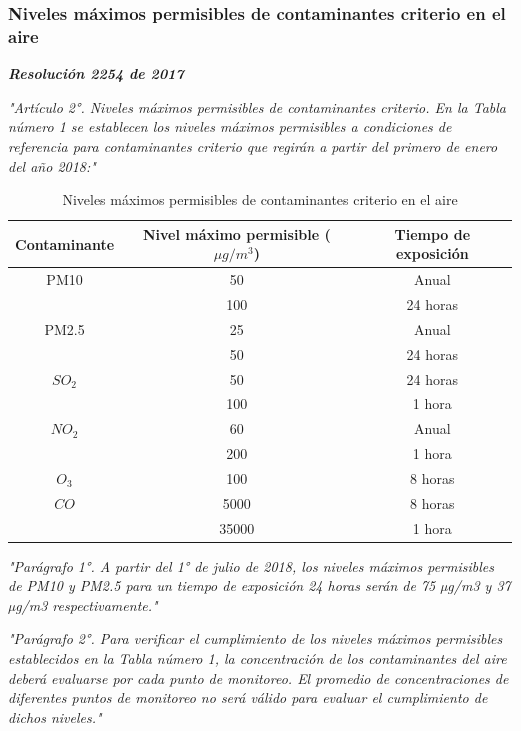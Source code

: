 \subsubsection{Niveles máximos permisibles de contaminantes criterio en el aire}

\textbf{\textit{Resolución 2254 de 2017}}

\textit{"Artículo 2°. Niveles máximos permisibles de contaminantes criterio. En la Tabla número 1 se establecen los niveles máximos permisibles a condiciones de referencia para contaminantes criterio que regirán a partir del primero de enero del año 2018:"}

\begin{table}[h!]
	\begin{center}
		\begin{tabular}{| c | c | c |}
			\hline
			\rowcolor{lightgray}Contaminante 	& Nivel máximo permisible ($ \mu g/m^3 $) 	& Tiempo de exposición	\\ \hline
			PM10			& 50 		& Anual		\\
			  				& 100 		& 24 horas	\\ \hline
			PM2.5 			& 25 		& Anual 	\\
				 			& 50 		& 24 horas	\\ \hline
 			$ SO_2 $		& 50 		& 24 horas 	\\
 							& 100 		& 1 hora	\\ \hline
 			$ NO_2 $		& 60 		& Anual 	\\
 							& 200 		& 1 hora	\\ \hline
 			$ O_3 $			& 100 		& 8 horas 	\\ \hline
 			$ CO $			& 5000 		& 8 horas 	\\
 							& 35000 	& 1 hora	\\ \hline
		\end{tabular}
		\caption{Niveles máximos permisibles de contaminantes criterio en el aire}
	\end{center}
\end{table}

\textit{"Parágrafo 1°. A partir del 1° de julio de 2018, los niveles máximos permisibles de PM10 y PM2.5 para un tiempo de exposición 24 horas serán de 75 µg/m3 y 37 µg/m3 respectivamente."}

\textit{"Parágrafo 2°. Para verificar el cumplimiento de los niveles máximos permisibles establecidos en la Tabla número 1, la concentración de los contaminantes del aire deberá evaluarse por cada punto de monitoreo. El promedio de concentraciones de diferentes puntos de monitoreo no será válido para evaluar el cumplimiento de dichos niveles."}

